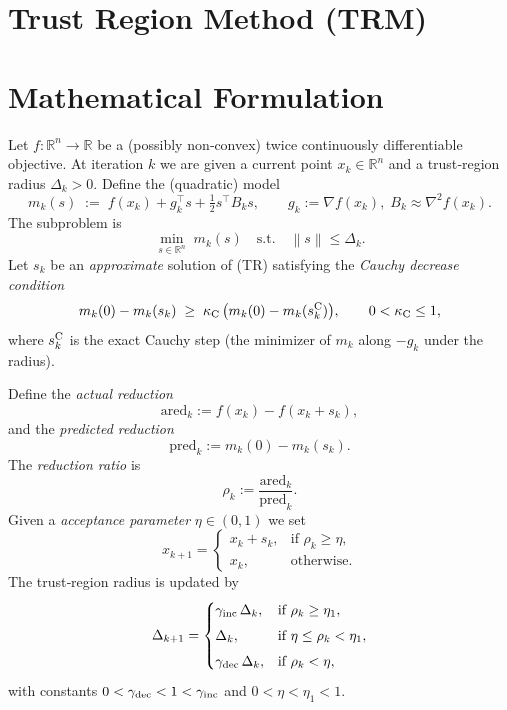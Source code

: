 \documentclass{article}
\newcommand{\norm}[1]{\left\lVert#1\right\rVert}
\newcommand{\R}{\mathbb{R}}
\begin{document}
\section*{Trust Region Method (TRM)}

\section*{Mathematical Formulation}
Let $f:\R^{n}\to\R$ be a (possibly non‑convex) twice continuously differentiable objective.  
At iteration $k$ we are given a current point $x_{k}\in\R^{n}$ and a trust‑region radius $\Delta_{k}>0$.  
Define the (quadratic) model
\[
m_{k}(s)\;:=\;f(x_{k})+g_{k}^{\top}s+\tfrac12 s^{\top}B_{k}s,
\qquad 
g_{k}:=\nabla f(x_{k}),\; B_{k}\approx\nabla^{2}f(x_{k}).
\]
The subproblem is
\[
\min_{s\in\R^{n}}\; m_{k}(s)\quad\text{s.t.}\quad \norm{s}\le \Delta_{k}. \tag{TR}
\]
Let $s_{k}$ be an \emph{approximate} solution of (TR) satisfying the \emph{Cauchy decrease condition}
\[
m_{k}(0)-m_{k}(s_{k})\;\ge\;\kappa_{\rm C}\,
\bigl(m_{k}(0)-m_{k}(s_{k}^{\rm C})\bigr),\qquad 0<\kappa_{\rm C}\le 1,
\]
where $s_{k}^{\rm C}$ is the exact Cauchy step (the minimizer of $m_k$ along $-g_k$ under the radius).

Define the \emph{actual reduction}
\[
\text{ared}_{k}:=f(x_{k})-f(x_{k}+s_{k}),
\]
and the \emph{predicted reduction}
\[
\text{pred}_{k}:=m_{k}(0)-m_{k}(s_{k}).
\]
The \emph{reduction ratio} is
\[
\rho_{k}:=\frac{\text{ared}_{k}}{\text{pred}_{k}}.
\]
Given a \emph{acceptance parameter} $\eta\in(0,1)$ we set
\[
x_{k+1}= 
\begin{cases}
x_{k}+s_{k}, & \text{if }\rho_{k}\ge\eta,\\[4pt]
x_{k}, & \text{otherwise.}
\end{cases}
\]
The trust‑region radius is updated by
\[
\Delta_{k+1}= 
\begin{cases}
\gamma_{\rm inc}\,\Delta_{k}, & \text{if }\rho_{k}\ge \eta_{1},\\[4pt]
\Delta_{k}, & \text{if }\eta\le\rho_{k}<\eta_{1},\\[4pt]
\gamma_{\rm dec}\,\Delta_{k}, & \text{if }\rho_{k}<\eta,
\end{cases}
\]
with constants $0<\gamma_{\rm dec}<1<\gamma_{\rm inc}$ and $0<\eta<\eta_{1}<1$.
\end{document}
